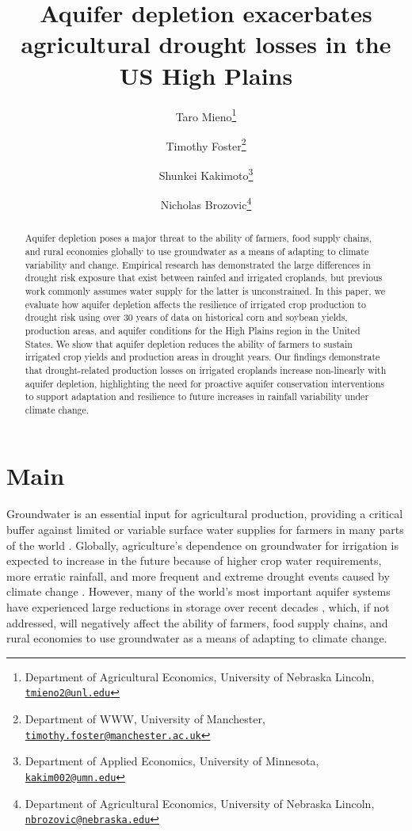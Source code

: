 \documentclass[
]{article}
\title{Aquifer depletion exacerbates agricultural drought losses in the US High Plains}
\author{Taro Mieno\footnote{Department of Agricultural Economics, University of Nebraska Lincoln, \href{mailto:tmieno2@unl.edu}{\nolinkurl{tmieno2@unl.edu}}} \and Timothy Foster\footnote{Department of WWW, University of Manchester, \href{mailto:timothy.foster@manchester.ac.uk}{\nolinkurl{timothy.foster@manchester.ac.uk}}} \and Shunkei Kakimoto\footnote{Department of Applied Economics, University of Minnesota, \href{mailto:kakim002@umn.edu}{\nolinkurl{kakim002@umn.edu}}} \and Nicholas Brozovic\footnote{Department of Agricultural Economics, University of Nebraska Lincoln, \href{mailto:nbrozovic@nebraska.edu}{\nolinkurl{nbrozovic@nebraska.edu}}}}
\date{}
\begin{document}
\maketitle
\begin{abstract}
Aquifer depletion poses a major threat to the ability of farmers, food supply chains, and rural economies globally to use groundwater as a means of adapting to climate variability and change. Empirical research has demonstrated the large differences in drought risk exposure that exist between rainfed and irrigated croplands, but previous work commonly assumes water supply for the latter is unconstrained. In this paper, we evaluate how aquifer depletion affects the resilience of irrigated crop production to drought risk using over 30 years of data on historical corn and soybean yields, production areas, and aquifer conditions for the High Plains region in the United States. We show that aquifer depletion reduces the ability of farmers to sustain irrigated crop yields and production areas in drought years. Our findings demonstrate that drought-related production losses on irrigated croplands increase non-linearly with aquifer depletion, highlighting the need for proactive aquifer conservation interventions to support adaptation and resilience to future increases in rainfall variability under climate change.
\end{abstract}

\hypertarget{main}{%
\section{Main}\label{main}}

Groundwater is an essential input for agricultural production, providing a critical buffer against limited or variable surface water supplies for farmers in many parts of the world \citep{scanlon2023global}. Globally, agriculture's dependence on groundwater for irrigation is expected to increase in the future because of higher crop water requirements, more erratic rainfall, and more frequent and extreme drought events caused by climate change \citep{zhou2010impact, wada2013multimodel, wada2014sustainability, kreins2015quantification, florke2018water}. However, many of the world's most important aquifer systems have experienced large reductions in storage over recent decades \citep{wada2010global, famiglietti2011satellites, scanlon2012groundwater, konikow2015long, bierkens2019non}, which, if not addressed, will negatively affect the ability of farmers, food supply chains, and rural economies to use groundwater as a means of adapting to climate change.
\end{document}
